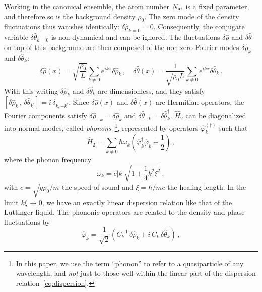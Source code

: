 \documentclass[aps,prd,notitlepage,amsfonts,amssymb,amsmath,nofootinbib,superscriptaddress,longbibliography]{revtex4-2}
\begin{document}
Working in the canonical ensemble, 
the atom number $N_{\rm at}$ is a fixed parameter, and therefore so is the background density $\rho_{0}$. The zero mode of the density fluctuations 
thus vanishes identically: $\delta \hat{\rho}_{k=0} = 0$. Consequently, the conjugate variable 
$\delta \hat{\theta}_{k=0}$ is non-dynamical and can be ignored. The fluctuations $\delta \hat{\rho}$ and $\delta \hat{\theta}$ on top of this background are then composed of the non-zero Fourier modes $\delta \hat{\rho}_{k}$ and $\delta \hat{\theta}_{k}$:
\begin{equation}
		\delta\hat{\rho}(x) = \sqrt{\frac{\rho_{0}}{L}} \sum_{k \neq 0} e^{i k x} \delta\hat{\rho}_{k} \,, \quad \delta\hat{\theta}(x) = \frac{1}{\sqrt{\rho_{0} L}} \sum_{k \neq 0} e^{i k x} \delta\hat{\theta}_{k} \,.
\end{equation}
With this writing  $\delta\hat{\rho}_{k}$ and $\delta\hat{\theta}_{k}$ are dimensionless, and they satisfy $\left[\delta\hat{\rho}_{k} \,,\, \delta\hat{\theta}_{k^{\prime}} \right] = i \, \delta_{k,-k^{\prime}}$.  Since $\delta\hat{\rho}(x)$ and $\delta\hat{\theta}(x)$ are Hermitian operators, the Fourier components satisfy $\delta\hat{\rho}_{-k} = \delta\hat{\rho}_{k}^{\dagger}$ and $\delta\hat{\theta}_{-k} = \delta\hat{\theta}_{k}^{\dagger}$. $\hat{H}_{2}$ can be diagonalized into normal modes, called {\it phonons}~\footnote{In this paper, we use the term ``phonon'' to refer to a quasiparticle of any wavelength, and \textit{not} just to those well within the linear part of the dispersion relation~\eqref{eq:dispersion}.}, represented by operators $\hat{\varphi}_{k}^{(\dagger)}$ such that
\begin{equation}
	\hat{H}_{2} = \sum_{k \neq 0} \hbar \omega_{k} \left( \hat{\varphi}^{\dagger}_{k}\hat{\varphi}_{k} + \frac{1}{2} \right) \,, 
	\label{eq:Hamiltonian_quadratic}
\end{equation}
where the phonon frequency
\begin{equation}
	\omega_{k} = c\left|k\right| \sqrt{1 + \frac{1}{4} k^{2} \xi^{2}} \,,
	\label{eq:dispersion}
\end{equation}
with $c = \sqrt{g \rho_{0} / m}$ the speed of sound and $\xi = \hbar/mc$ the healing length. In the limit $k \xi \xrightarrow{} 0$, we have an exactly linear dispersion relation like that of the Luttinger liquid. The phononic operators are related to the density and phase fluctuations by
\begin{equation}
	\hat{\varphi}_{k} = \frac{1}{\sqrt{2}} \left( C_{k}^{-1} \, \delta\hat{\rho}_{k} + i \, C_{k} \, \delta\hat{\theta}_{k} \right) \,,
\end{equation}
\end{document}
